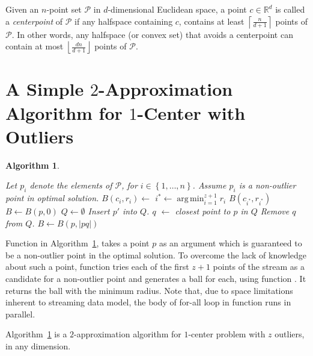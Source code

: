 \documentclass[envcountsame]{cls/cccg15}
\newtheorem{algorithm}{Algorithm}
\DeclareMathOperator*{\argmin}{arg\,min}
\newcommand{\IR}{\ensuremath{\mathbb{R}}}
\newcommand{\set}[1]{\left\{ #1 \right\}}
\newcommand{\ceil}[1]{\left\lceil{#1}\right\rceil}
\newcommand{\floor}[1]{\left\lfloor{#1}\right\rfloor}
\newcommand{\card}[1]{\left|{#1}\right|}
\begin{document}
Given an $n$-point set $\mathcal{P}$ in $d$-dimensional Euclidean space, a point $c \in \IR^d$ is called a \emph{centerpoint} of $\mathcal{P}$ if any halfspace containing $c$, contains at least $\ceil{\frac{n}{d + 1}}$ points of $\mathcal{P}$. In other words, any halfspace (or convex set) that avoids a centerpoint can contain at most $\floor{\frac{dn}{d + 1}}$ points of $\mathcal{P}$. 



\section{A Simple $2$-Approximation Algorithm for $1$-Center with Outliers}
\label{sec:2apr}

\begin{algorithm}
\label{alg:1center}
\leavevmode
\begin{algorithmic}
	\State Let $p_i$ denote the elements of $\mathcal{P}$, for $i \in \set{1, \dots, n}$.
		\State Assume $p_i$ is a non-outlier point in optimal solution.
		\State $B(c_i, r_i) \gets$ 
	\EndFor
	\State $i^* \gets \argmin_{i=1}^{z+1} r_i$
	\State \Return $B(c_{i^*}, r_{i^*})$
\EndFunction
\Statex
{}
	\State $B \gets B(p, 0)$
	\State $Q \gets \emptyset$
			\State Insert $p'$ into $Q$.
			\If{$\card{Q} = z + 1$}
				\State $q$ $\gets$ closest point to $p$ in $Q$
				\State Remove $q$ from $Q$.
				\State $B \gets B(p, \card{pq})$
			\EndIf
		\EndIf
	\EndFor
	\State {}
\EndFunction
\end{algorithmic}
\end{algorithm}
Function  in Algorithm~\ref{alg:1center}, takes a point $p$ as an argument which is guaranteed to be a non-outlier point in the optimal solution. To overcome the lack of knowledge about such a point, function  tries each of the first $z+1$ points of the stream as a candidate for a non-outlier point and generates a ball for each, using function . It returns the ball with the minimum radius. Note that, due to space limitations inherent to streaming data model, the body of for-all loop in function  runs in parallel.

\begin{theorem}
Algorithm~\ref{alg:1center} is a $2$-approximation algorithm for $1$-center problem with $z$ outliers, in any dimension.
\end{theorem}
\end{document}
